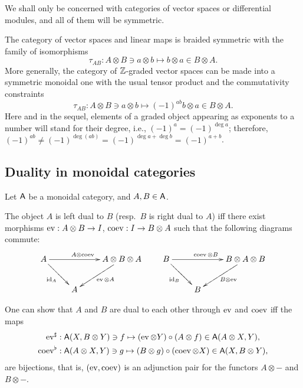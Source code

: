We shall only be concerned with categories of vector spaces or
differential modules, and all of them will be symmetric.
\begin{example}
  \label{xmp:vec1}
  The category of vector spaces and linear maps is braided symmetric
  with the family of isomorphisms
  \begin{equation*}
    \tau_{AB}: A\otimes B \ni a\otimes b \mapsto b\otimes a \in B\otimes A.
  \end{equation*}
  More generally, the category of $\mathbb{Z}$-graded vector spaces can be
  made into a symmetric monoidal one with the usual tensor product and
  the commutativity constraints
  \begin{equation*}
    \tau_{AB}: A\otimes B \ni a\otimes b \mapsto (-1)^{ab}b\otimes a \in B\otimes A.
  \end{equation*}
  Here and in the sequel, elements of a graded object appearing as
  exponents to a number will stand for their degree, i.e., \((-1)^a =
  (-1)^{\deg a}\); therefore, \((-1)^{ab} \not= (-1)^{\deg (ab)} =
  (-1)^{\deg a + \deg b} = (-1)^{a+b}\).
\end{example}


\subsection{Duality in monoidal categories}
\label{sec:duality}

Let $\mathsf{A}$ be a monoidal category, and $A,B \in \mathsf{A}$.
\begin{definition}
  The object $A$ is left dual to $B$ (resp.\ $B$ is right dual to $A$)
  iff there exist morphisms $\operatorname{ev}: A\otimes B \to I$, $\operatorname{coev}: I \to B\otimes A$ such
  that the following diagrams commute:
  \begin{equation*}
    \xymatrix{%
      A
      &
      &
      A\otimes B\otimes A
      \\
      &
      A
      &
      \ar "1,1";"1,3" ^{A\otimes\coev}
      \ar "1,1";"2,2" _{\id_A}
      \ar "1,3";"2,2" ^{\ev\otimes A}
      }
    \qquad
    \xymatrix{%
      B
      &
      &
      B\otimes A\otimes B
      \\
      &
      B
      &
      \ar "1,1";"1,3" ^{\coev\otimes B}
      \ar "1,1";"2,2" _{\id_B}
      \ar "1,3";"2,2" ^{B\otimes\ev}
      }
  \end{equation*}
\end{definition}
One can show that $A$ and $B$ are dual to each other through $\operatorname{ev}$ and
$\operatorname{coev}$ iff the maps
\begin{align*}
  \operatorname{ev}^\sharp   &: \mathsf{A}(X,B\otimes Y) \ni f \mapsto (\operatorname{ev}\otimes Y)\circ(A\otimes f) \in \mathsf{A}(A\otimes X, Y),
  \\
  \operatorname{coev}^\flat &: \mathsf{A}(A\otimes X,Y) \ni g \mapsto (B\otimes g)\circ(\operatorname{coev}\otimes X) \in \mathsf{A}(X, B\otimes Y),
\end{align*}
are bijections, that is, $(\operatorname{ev}, \operatorname{coev})$ is an adjunction pair for the
functors $A\otimes-$ and $B\otimes-$.

